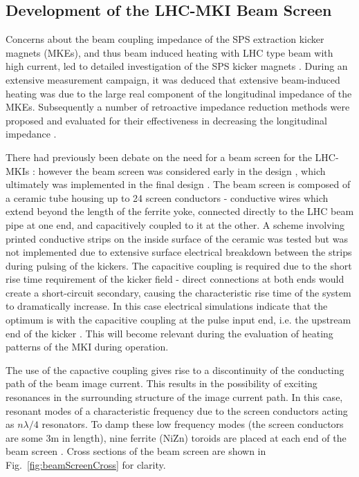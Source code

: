 \subsection{Development of the LHC-MKI Beam Screen}
\label{sec:mki-screen-development}

Concerns about the beam coupling impedance of the SPS extraction kicker magnets (MKEs), and thus beam induced heating with LHC type beam with high current, led to detailed investigation of the SPS kicker magnets \cite{Arduini:beamInducedSPS}. During an extensive measurement campaign, it was deduced that extensive beam-induced heating was due to the large real component of the longitudinal impedance of the MKEs. Subsequently a number of retroactive impedance reduction methods were proposed and evaluated for their effectiveness in decreasing the longitudinal impedance \cite{Kroyer:MKEReduct}.

There had previously been debate on the need for a beam screen for the LHC-MKIs \cite{Vos:beamScreen}: however the beam screen was considered early in the design \cite{Ducimetiere:designMKI}, which ultimately was implemented in the final design \cite{Barnes:improvBeamScreen}. The beam screen is composed of a ceramic tube housing up to 24 screen conductors - conductive wires which extend beyond the length of the ferrite yoke, connected directly to the LHC beam pipe at one end, and capacitively coupled to it at the other. A scheme involving printed conductive strips on the inside surface of the ceramic was tested but was not implemented due to extensive surface electrical breakdown between the strips during pulsing of the kickers. The capacitive coupling is required due to the short rise time requirement of the kicker field - direct connections at both ends would create a short-circuit secondary, causing the characteristic rise time of the system to dramatically increase. In this case electrical simulations indicate that the optimum is with the capacitive coupling at the pulse input end, i.e. the upstream end of the kicker \cite{Barnes:improvBeamScreen}. This will become relevant during the evaluation of heating patterns of the MKI during operation.

The use of the capactive coupling gives rise to a discontinuity of the conducting path of the beam image current. This results in the possibility of exciting resonances in the surrounding structure of the image current path. In this case, resonant modes of a characteristic frequency due to the screen conductors acting as $n \lambda /4$ resonators. To damp these low frequency modes (the screen conductors are some 3m in length), nine ferrite (NiZn) toroids are placed at each end of the beam screen \cite{Caspers:impMeasMKI, Caspera:impMeasLowFreqMKI, Barnes:mkiVacTemp}. Cross sections of the beam screen are shown in Fig.~\ref{fig:beamScreenCross} for clarity.

